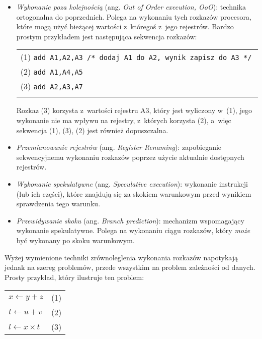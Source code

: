 \documentclass{mwart}
\begin{document}
\begin{itemize}
	\item \emph{Wykonanie poza kolejnością} (ang. \emph{Out of Order execution, OoO}): technika ortogonalna do poprzednich. Polega na 
		wykonaniu tych rozkazów procesora, które mogą użyć bieżącej wartości z~któregoś z~jego rejestrów. Bardzo prostym przykładem jest 
		następująca sekwencja rozkazów:
	\begin{center}
	\begin{tabular}{l}\\
		(1) {\tt add A1,A2,A3 /* dodaj A1 do A2, wynik zapisz do A3 */ } \\
		(2) {\tt add A1,A4,A5 } \\
		(3) {\tt add A2,A3,A7 } \\
		\\
	\end{tabular}
	\end{center}
	Rozkaz (3) korzysta z~wartości rejestru A3, który jest wyliczony w~(1), jego wykonanie nie ma wpływu na rejestry, z~których 
	korzysta (2), a~więc sekwencja (1), (3), (2) jest również dopuszczalna.
	\item \emph{Przemianowanie rejestrów} (ang. \emph{Register Renaming}): zapobieganie sekwencyjnemu wykonaniu rozkazów poprzez użycie 
		aktualnie dostępnych rejestrów.
	\item \emph{Wykonanie spekulatywne} (ang. \emph{Speculative execution}): wykonanie instrukcji (lub ich części), które znajdują się
		za skokiem warunkowym przed wynikiem sprawdzenia tego warunku.
	\item \emph{Przewidywanie skoku} (ang. \emph{Branch prediction}): mechanizm wspomagający wykonanie spekulatywne. Polega na wykonaniu
	 ciągu rozkazów, który \emph{może} być wykonany po skoku warunkowym.
	\end{itemize}
\par
%
\indent
	Wyżej wymienione techniki zrównoleglenia wykonania rozkazów napotykają jednak na szereg problemów, przede wszystkim na problem
	zależności od danych.
	Prosty przykład, który ilustruje ten problem:
	\begin{flushright}
	\begin{tabular}{l l}\\
		$x \gets y + z$ & \hspace{4.2cm} (1)\\
		$t \gets u + v$ & \hspace{4.2cm} (2)\\
		$l \gets x \times t$ & \hspace{4.2cm} (3)\\
	\end{tabular}\\
	\end{flushright}
\end{document}

